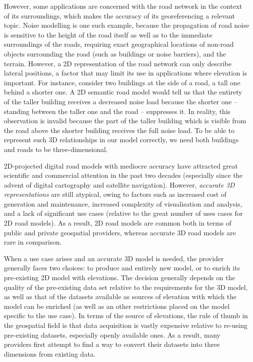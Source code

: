 However, some applications are concerned with the road network in the context of its surroundings, which makes the accuracy of its georeferencing a relevant topic. Noise modelling is one such example, because the propagation of road noise is sensitive to the height of the road itself as well as to the immediate surroundings of the roads, requiring exact geographical locations of non-road objects surrounding the road (such as buildings or noise barriers), and the terrain. However, a 2D representation of the road network can only describe lateral positions, a factor that may limit its use in applications where elevation is important. For instance, consider two buildings at the side of a road, a tall one behind a shorter one. A 2D semantic road model would tell us that the entirety of the taller building receives a decreased noise load because the shorter one – standing between the taller one and the road – suppresses it. In reality, this observation is invalid because the part of the taller building which is visible from the road above the shorter building receives the full noise load. To be able to represent such 3D relationships in our model correctly, we need both buildings and roads to be three-dimensional.

2D-projected digital road models with mediocre accuracy have attracted great scientific and commercial attention in the past two decades (especially since the advent of digital cartography and satellite navigation). However, \textit{accurate 3D representations} are still atypical, owing to factors such as increased cost of generation and maintenance, increased complexity of visualisation and analysis, and a lack of significant use cases (relative to the great number of uses cases for 2D road models). As a result, 2D road models are common both in terms of public and private geospatial providers, whereas accurate 3D road models are rare in comparison.

When a use case arises and an accurate 3D model is needed, the provider generally faces two choices: to produce and entirely new model, or to enrich its pre-existing 2D model with elevations. The decision generally depends on the quality of the pre-existing data set relative to the requirements for the 3D model, as well as that of the datasets available as sources of elevation with which the model can be enriched (as well as an other restrictions placed on the model specific to the use case). In terms of the source of elevations, the rule of thumb in the geospatial field is that data acquisition is vastly expensive relative to re-using pre-existing datasets, especially openly available ones. As a result, many providers first attempt to find a way to convert their datasets into three dimensions from existing data.

